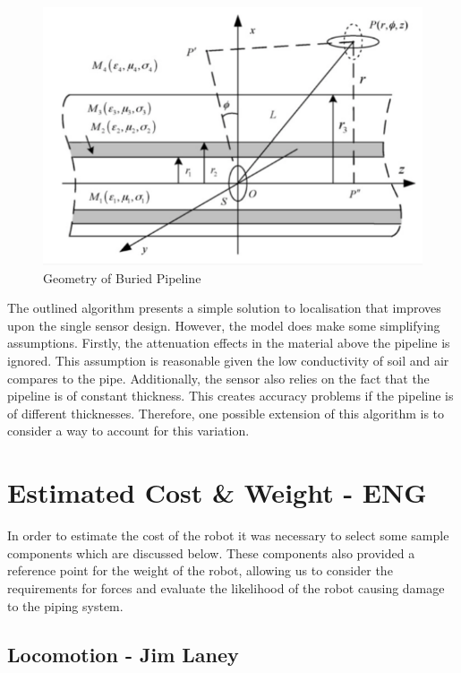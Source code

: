 \documentclass[11pt]{article}		%
\begin{document}
			\begin{figure}[h]
				\centering
				\includegraphics[scale=1]{localisation.pdf}
				\caption{Geometry of Buried Pipeline}
				\label{localisation}
			\end{figure}
			
			The outlined algorithm presents a simple solution to localisation that improves upon the single sensor design. However, the model does make some simplifying assumptions. Firstly, the attenuation effects in the material above the pipeline is ignored. This assumption is reasonable given the low conductivity of soil and air compares to the pipe. Additionally, the sensor also relies on the fact that the pipeline is of constant thickness. This creates accuracy problems if the pipeline is of different thicknesses. Therefore, one possible extension of this algorithm is to consider a way to account for this variation. 

	\section{Estimated Cost \& Weight - ENG}
		
		In order to estimate the cost of the robot it was necessary to select some sample components which are discussed below.
		These components also provided a reference point for the weight of the robot, allowing us to consider the requirements for forces and evaluate the likelihood of the robot causing damage to the piping system.
		
		\subsection[Locomotion]{Locomotion - Jim Laney}
		
\end{document}
